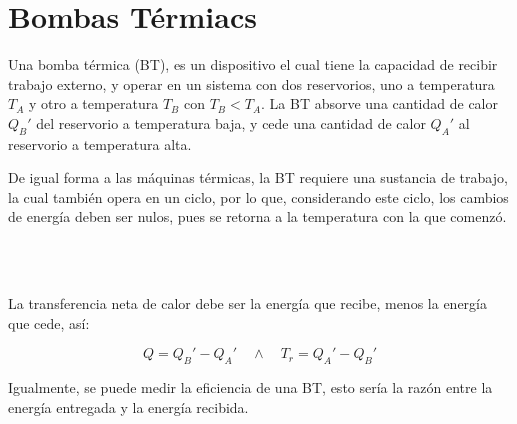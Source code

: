 \section{Bombas Térmiacs}

Una bomba térmica (BT), es un dispositivo el cual tiene la capacidad de
recibir trabajo externo, y operar en un sistema con dos reservorios,
uno a temperatura $T_A$ y otro a temperatura $T_B$ con $T_B < T_A$. La BT
absorve una cantidad de calor $Q_B'$ del reservorio a temperatura baja, y cede
una cantidad de calor $Q_A'$ al reservorio a temperatura alta.

\begin{center}
\end{center}

De igual forma a las máquinas térmicas, la BT requiere una sustancia de
trabajo, la cual también opera en un ciclo, por lo que, considerando este
ciclo, los cambios de energía deben ser nulos, pues se retorna a la
temperatura con la que comenzó.

\begin{longderivation}
  \\
\\
\end{longderivation}

La transferencia neta de calor debe ser la energía que recibe, menos la
energía que cede, así:

\[Q = Q_B' - Q_A' \quad\land\quad T_r = Q_A' - Q_B'\]

Igualmente, se puede medir la eficiencia de una BT, esto sería la razón
entre la energía entregada y la energía recibida.

